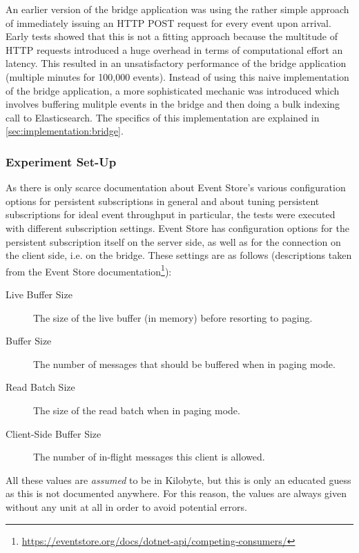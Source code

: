 An earlier version of the bridge application was using the rather simple approach of immediately issuing an \ac{HTTP} POST request for every event upon arrival.
Early tests showed that this is not a fitting approach because the multitude of HTTP requests introduced a huge overhead in terms of computational effort an latency.
This resulted in an unsatisfactory performance of the bridge application (multiple minutes for 100,000 events).
Instead of using this naive implementation of the bridge application, a more sophisticated mechanic was introduced which involves buffering mulitple events in the bridge and then doing a bulk indexing call to Elasticsearch.
The specifics of this implementation are explained in \cref{sec:implementation:bridge}.

\subsubsection{Experiment Set-Up}

As there is only scarce documentation about Event Store's various configuration options for persistent subscriptions in general and about tuning persistent subscriptions for ideal event throughput in particular, the tests were executed with different subscription settings.
Event Store has configuration options for the persistent subscription itself on the server side, as well as for the connection on the client side, i.e. on the bridge.
These settings are as follows (descriptions taken from the Event Store documentation\footnote{\url{https://eventstore.org/docs/dotnet-api/competing-consumers/}}):

\begin{description}
\item[Live Buffer Size] The size of the live buffer (in memory) before resorting to paging.
\item[Buffer Size] The number of messages that should be buffered when in paging mode.
\item[Read Batch Size] The size of the read batch when in paging mode.
\item[Client-Side Buffer Size] The number of in-flight messages this client is allowed.
\end{description}

All these values are \emph{assumed} to be in Kilobyte, but this is only an educated guess as this is not documented anywhere.
For this reason, the values are always given without any unit at all in order to avoid potential errors.

